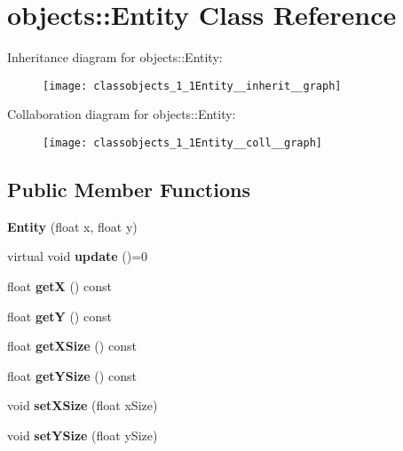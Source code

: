 \hypertarget{classobjects_1_1Entity}{}\section{objects\+:\+:Entity Class Reference}
\label{classobjects_1_1Entity}


Inheritance diagram for objects\+:\+:Entity\+:\nopagebreak
\begin{figure}[H]
\begin{center}
\leavevmode
\texttt{[image: classobjects\_1\_1Entity\_\_inherit\_\_graph]}
\end{center}
\end{figure}


Collaboration diagram for objects\+:\+:Entity\+:\nopagebreak
\begin{figure}[H]
\begin{center}
\leavevmode
\texttt{[image: classobjects\_1\_1Entity\_\_coll\_\_graph]}
\end{center}
\end{figure}
\subsection*{Public Member Functions}
\begin{DoxyCompactItemize}
\item 
\mbox{\label{classobjects_1_1Entity_a3296f5835063af13ba9569156389f0dc}}
{\bfseries Entity} (float x, float y)
\item 
\mbox{\label{classobjects_1_1Entity_a691e01bec14ee30f0dafbc737c91dd65}}
virtual void {\bfseries update} ()=0
\item 
\mbox{\label{classobjects_1_1Entity_a2c862fc18b3bfbdc0be17c1a3aaf481e}}
float {\bfseries getX} () const
\item 
\mbox{\label{classobjects_1_1Entity_aca6bc17b74cb9f128c7d2dcc35289872}}
float {\bfseries getY} () const
\item 
\mbox{\label{classobjects_1_1Entity_a39f898fbcc8567863445b4eb37cd0c8e}}
float {\bfseries get\+X\+Size} () const
\item 
\mbox{\label{classobjects_1_1Entity_ac2d2d809988105028e4780ca9ae7bef0}}
float {\bfseries get\+Y\+Size} () const
\item 
\mbox{\label{classobjects_1_1Entity_aa3a8d8b0fe6c9d24ceefc2ee9b43eeba}}
void {\bfseries set\+X\+Size} (float x\+Size)
\item 
\mbox{\label{classobjects_1_1Entity_a84bfd5b99f29a311ba56d2a169159a58}}
void {\bfseries set\+Y\+Size} (float y\+Size)
\end{DoxyCompactItemize}
